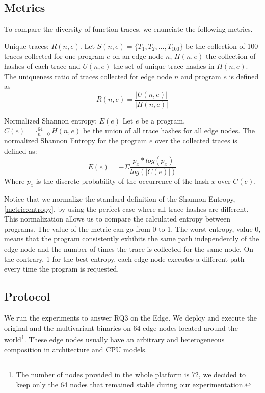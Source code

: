\subsection*{Metrics}

To compare the diversity of function traces, we enunciate the following metrics.  


\begin{metric}{Unique traces: $R(n, e)$.}\label{metric:ratio:mve}
    Let $S(n, e)=\{T_1, T_2, ..., T_{100}\}$ be the collection of 100 traces collected for one program $e$ on an edge node $n$, $H(n, e)$ the collection of hashes of each trace and $U(n, e)$ the set of unique trace hashes in $H(n,e)$.
    The uniqueness ratio of traces collected for edge node $n$ and program $e$ is defined as
    $$
        R(n,e) = \frac{|U(n,e)|}{|H(n, e)|}
    $$
\end{metric}


\begin{metric}{Normalized Shannon entropy: $E(e)$}\label{metric:entropy}
    Let $e$ be a program, $C(e)=\cdot_{n=0}^{64} H(n, e)$ be the union  of all trace hashes for all edge nodes.
    The normalized Shannon Entropy for the program $e$ over the collected traces is defined as: \\
    $$
        E(e)=-\Sigma \frac{p_x*log(p_x)}{log(|C(e)|)}
    $$
    Where $p_x$ is the discrete probability of the occurrence of the hash $x$ over $C(e)$.
    
\end{metric}

Notice that we normalize the standard definition of the Shannon Entropy, \autoref{metric:entropy}, by using the perfect case where all trace hashes are different. 
This normalization allows us to compare the calculated entropy between programs.
The value of the metric can go from 0 to 1. The worst entropy, value 0, means that the program consistently exhibits the same path independently of the edge node and the number of times the trace is collected for the same node. On the contrary, 1 for the best entropy, each edge node executes a different path every time the program is requested.

\subsection*{Protocol}


We run the experiments to answer RQ3 on the Edge. We deploy and execute the original and the multivariant binaries on 64 edge nodes located around the world\footnote{The number of nodes provided in the whole platform is 72, we decided to keep only the 64 nodes that remained stable during our experimentation.}.
These edge nodes usually have an arbitrary and heterogeneous composition in architecture and CPU models.



